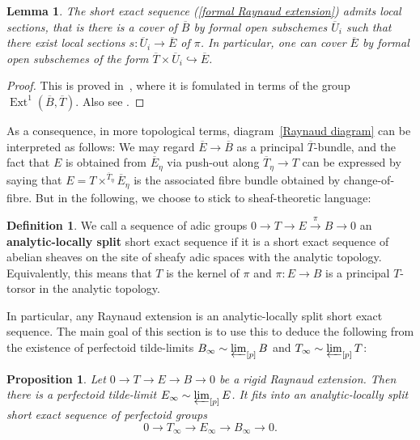 \documentclass[10pt,oneside]{amsart}
\newtheorem{lemma}[theorem]{Lemma}
\newtheorem{proposition}[theorem]{Proposition}
\theoremstyle{definition}
\newtheorem{definition}[theorem]{Definition}
\begin{document}
	\begin{lemma}\label{formal Raynaud sequence is locally split}
		The short exact sequence (\ref{formal Raynaud extension}) admits local sections, that is there is a cover of $\overline{B}$ by formal open subschemes $\overline{U}_i$ such that there exist local sections $s:\overline{U}_i\rightarrow \overline{E}$ of $\pi$. In particular, one can cover $\overline{E}$ by formal open subschemes of the form $\overline{T}\times \overline{U}_i\hookrightarrow \overline{E}$.
	\end{lemma}
	\begin{proof}
		This is proved in~\cite[Proposition A.2.5]{Lut}, where it is fomulated in terms of the group $\operatorname{Ext}^1(\overline{B},\overline{T})$. Also see \cite[ \S 1]{BL}.
	\end{proof}
	
	As a consequence, in more topological terms, diagram~\eqref{Raynaud diagram} can be interpreted as follows: We may regard
	$\overline{E}\rightarrow \overline{B}$ as a principal $\overline{T}$-bundle, and the fact that $E$ is obtained from $\overline{E}_\eta$ via push-out along $\overline{T}_\eta\rightarrow T$ can be expressed by saying that $E = T\times^{\overline{T}_\eta}\overline{E}_\eta$ is the associated fibre bundle obtained by change-of-fibre. But in the following, we choose to stick to sheaf-theoretic language:
	
	\begin{definition}
		We call a sequence of adic groups $0\to T\to E\xrightarrow{\pi} B\to 0$ an \textbf{analytic-locally split} short exact sequence if it is a short exact sequence of abelian sheaves on the site of sheafy adic spaces with the analytic topology. Equivalently, this means that $T$ is the kernel of $\pi$ and $\pi:E\to B$ is a principal $T$-torsor in the analytic topology.
	\end{definition}
	In particular, any Raynaud extension is an analytic-locally split short exact sequence. The main goal of this section is to use this to deduce the following from the existence of perfectoid tilde-limits $B_\infty\sim \varprojlim_{[p]}B$ and $T_\infty\sim \varprojlim_{[p]}T$:
	\begin{proposition}\label{p-F-formal tower exists for E}
		Let $0\to T\to E\to B\to 0$ be a rigid Raynaud extension. Then there is a perfectoid tilde-limit $E_\infty\sim \varprojlim_{[p]}E$. It fits into an analytic-locally split short exact sequence of perfectoid groups 
		\[0\to T_\infty\to E_\infty\to B_\infty\to 0.\]
	\end{proposition}
	
\end{document}
